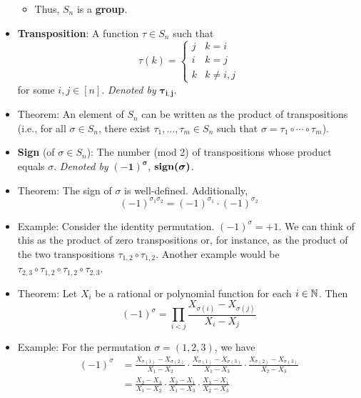 \documentclass[../notes.tex]{subfiles}
\begin{document}
\begin{itemize}
    \begin{itemize}
        \item Thus, $S_n$ is a \textbf{group}.
    \end{itemize}
    \item \textbf{Transposition}: A function $\tau\in S_n$ such that
    \begin{equation*}
        \tau(k) =
        \begin{cases}
            j & k=i\\
            i & k=j\\
            k & k\neq i,j
        \end{cases}
    \end{equation*}
    for some $i,j\in[n]$. \emph{Denoted by} $\bm{\tau_{i,j}}$.
    \item Theorem: An element of $S_n$ can be written as the product of transpositions (i.e., for all $\sigma\in S_n$, there exist $\tau_1,\dots,\tau_m\in S_n$ such that $\sigma=\tau_1\circ\cdots\circ\tau_m$).
    \item \textbf{Sign} (of $\sigma\in S_n$): The number (mod 2) of transpositions whose product equals $\sigma$. \emph{Denoted by} $\bm{(-1)^\sigma}$, $\bm{\sgn(\sigma)}$.
    \item Theorem: The sign of $\sigma$ is well-defined. Additionally,
    \begin{equation*}
        (-1)^{\sigma_1\sigma_2} = (-1)^{\sigma_1}\cdot(-1)^{\sigma_2}
    \end{equation*}
    \item Example: Consider the identity permutation. $(-1)^\sigma=+1$. We can think of this as the product of zero transpositions or, for instance, as the product of the two transpositions $\tau_{1,2}\circ\tau_{1,2}$. Another example would be $\tau_{2,3}\circ\tau_{1,2}\circ\tau_{1,2}\circ\tau_{2,3}$.
    \item Theorem: Let $X_i$ be a rational or polynomial function for each $i\in\mathbb{N}$. Then
    \begin{equation*}
        (-1)^\sigma = \prod_{i<j}\frac{X_{\sigma(i)}-X_{\sigma(j)}}{X_i-X_j}
    \end{equation*}
    \item Example: For the permutation $\sigma=(1,2,3)$, we have
    \begin{align*}
        (-1)^\sigma &= \frac{X_{\sigma(1)}-X_{\sigma(2)}}{X_1-X_2}\cdot\frac{X_{\sigma(1)}-X_{\sigma(3)}}{X_1-X_3}\cdot\frac{X_{\sigma(2)}-X_{\sigma(3)}}{X_2-X_3}\\
        &= \frac{X_2-X_3}{X_1-X_2}\cdot\frac{X_2-X_1}{X_1-X_3}\cdot\frac{X_3-X_1}{X_2-X_3}\\

\end{align*}
\end{itemize}
\end{document}
